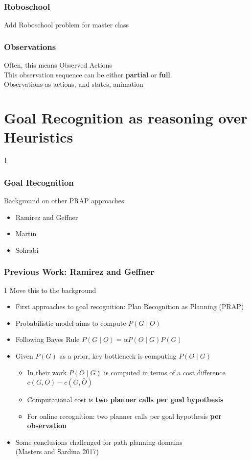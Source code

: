 \documentclass{beamer}
\newcommand{\todo}[1]{ {\color{red} #1} }
\def\masterclass{1}
\begin{document}
	\begin{frame}[c]\frametitle{Roboschool}
		{\color{red} Add Roboschool problem for master class}
	\end{frame}
	
	\begin{frame}[c]\frametitle{Observations}
		Often, this means Observed Actions\\
        This observation sequence can be either \textbf{partial} or \textbf{full}.\\
            \todo{Observations as actions, and states, animation}
	\end{frame}
\fi

	
	\section{Goal Recognition as reasoning over Heuristics}

\if\masterclass1
	\begin{frame}[c]\frametitle{Goal Recognition}
		Background on other PRAP approaches:
		\begin{itemize}
			\item Ramirez and Geffner
			\item Martin
			\item Sohrabi
		\end{itemize}
	\end{frame}
	\begin{frame}[c]\frametitle{Previous Work: Ramirez and Geffner}
		\if\masterclass1
		\todo{Move this to the background}
		\fi
		\begin{itemize}
			\item First approaches to goal recognition: Plan Recognition as Planning (PRAP)
			\item Probabilistic model aims to compute $P(G \mid O)$
			\item Following Bayes Rule $P(G \mid O) = \alpha P(O \mid G) P(G)$
			\item Given $P(G)$ as a prior, key bottleneck is computing $P(O \mid G)$
			\begin{itemize}
				\item In their work $P(O \mid G)$ is computed in terms of a cost difference $c(G,O) - c(G,\bar{O})$
				\item Computational cost is \textbf{two planner calls per goal hypothesis}
				\item For online recognition: two planner calls per goal hypothesis \textbf{per observation}
			\end{itemize}
			\item Some conclusions challenged for path planning domains\\ (Masters and Sardina 2017)
		\end{itemize}
	\end{frame}
\fi
	
\end{document}
